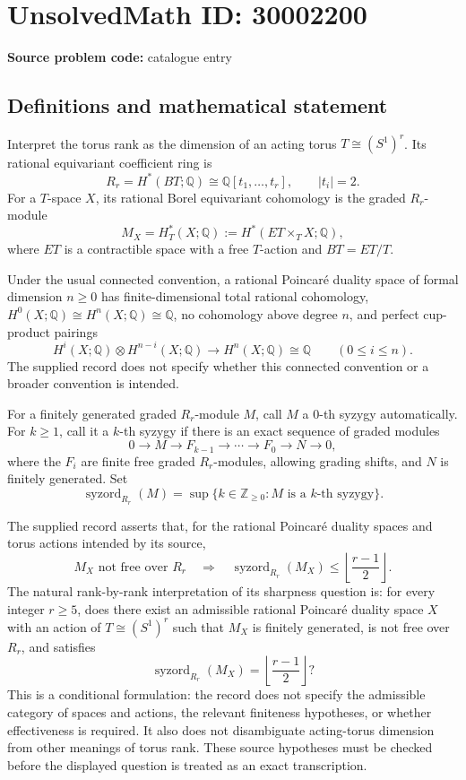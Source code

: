 \documentclass[11pt]{article}
\newcommand{\Z}{\mathbb{Z}}
\newcommand{\Q}{\mathbb{Q}}
\begin{document}
\section*{UnsolvedMath ID: 30002200}
\textbf{Source problem code:} catalogue entry
\subsection{Definitions and mathematical statement}
Interpret the torus rank as the dimension of an acting torus \(T\cong(S^1)^r\). Its rational equivariant coefficient ring is
\[
R_r=H^*(BT;\Q)\cong\Q[t_1,\ldots,t_r],\qquad |t_i|=2.
\]
For a \(T\)-space \(X\), its rational Borel equivariant cohomology is the graded \(R_r\)-module
\[
M_X=H_T^*(X;\Q):=H^*(ET\times_T X;\Q),
\]
where \(ET\) is a contractible space with a free \(T\)-action and \(BT=ET/T\).

Under the usual connected convention, a rational Poincar\'e duality space of formal dimension \(n\geq0\) has finite-dimensional total rational cohomology, \(H^0(X;\Q)\cong H^n(X;\Q)\cong\Q\), no cohomology above degree \(n\), and perfect cup-product pairings
\[
H^i(X;\Q)\otimes H^{n-i}(X;\Q)\longrightarrow H^n(X;\Q)\cong\Q
\qquad(0\leq i\leq n).
\]
The supplied record does not specify whether this connected convention or a broader convention is intended.

For a finitely generated graded \(R_r\)-module \(M\), call \(M\) a \(0\)-th syzygy automatically. For \(k\geq1\), call it a \(k\)-th syzygy if there is an exact sequence of graded modules
\[
0\longrightarrow M\longrightarrow F_{k-1}\longrightarrow\cdots\longrightarrow F_0\longrightarrow N\longrightarrow0,
\]
where the \(F_i\) are finite free graded \(R_r\)-modules, allowing grading shifts, and \(N\) is finitely generated. Set
\[
\operatorname{syzord}_{R_r}(M)=\sup\{k\in\Z_{\geq0}:M\text{ is a }k\text{-th syzygy}\}.
\]

The supplied record asserts that, for the rational Poincar\'e duality spaces and torus actions intended by its source,
\[
M_X\text{ not free over }R_r
\quad\Longrightarrow\quad
\operatorname{syzord}_{R_r}(M_X)\leq
\left\lfloor\frac{r-1}{2}\right\rfloor.
\]
The natural rank-by-rank interpretation of its sharpness question is: for every integer \(r\geq5\), does there exist an admissible rational Poincar\'e duality space \(X\) with an action of \(T\cong(S^1)^r\) such that \(M_X\) is finitely generated, is not free over \(R_r\), and satisfies
\[
\operatorname{syzord}_{R_r}(M_X)=\left\lfloor\frac{r-1}{2}\right\rfloor?
\]
This is a conditional formulation: the record does not specify the admissible category of spaces and actions, the relevant finiteness hypotheses, or whether effectiveness is required. It also does not disambiguate acting-torus dimension from other meanings of torus rank. These source hypotheses must be checked before the displayed question is treated as an exact transcription.
\end{document}
